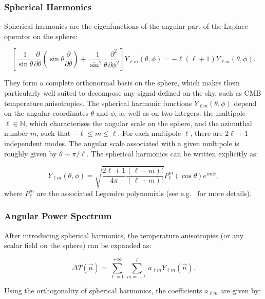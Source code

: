\documentclass[../../thesis.tex]{subfiles}
\begin{document}
\subsubsection{Spherical Harmonics}

Spherical harmonics are the eigenfunctions of the angular part of the Laplace operator on the sphere:

\begin{equation} \label{eq:laplace}
    [\frac{1}{\sin\theta}\frac{\partial}{\partial\theta}(\sin\theta\frac{\partial}{\partial\theta}) + \frac{1}{\sin^2\theta}\frac{\partial^2}{\partial\phi^2}] Y_{\ell m}(\theta,\phi) = -\ell(\ell + 1) Y_{\ell m}(\theta,\phi).
\end{equation}

They form a complete orthonormal basis on the sphere, which makes them particularly well suited to decompose any signal defined on the sky, such as CMB temperature anisotropies.
The spherical harmonic functions $Y_{\ell m}(\theta,\phi)$ depend on the angular coordinates $\theta$ and $\phi$, as well as on two integers: the multipole $\ell \in \mathbb{N}$, which characterises the angular scale on the sphere, and the azimuthal number $m$, such that $-\ell \leq m \leq \ell$. For each multipole $\ell$, there are $2\ell + 1$ independent modes. The angular scale associated with a given multipole is roughly given by $\theta \sim \pi / \ell$.
The spherical harmonics can be written explicitly as:

\begin{equation}
    Y_{\ell m}(\theta,\phi) = \sqrt{\frac{2\ell+1}{4\pi}\frac{(\ell-m)!}{(\ell+m)!}} P^m_{\ell}(\cos\theta)e^{i m \phi},
\end{equation}
where $P^m_{\ell}$ are the associated Legendre polynomials (see e.g.~\cite{maths_handbook} for more details).

\subsubsection{Angular Power Spectrum} 

After introducing spherical harmonics, the temperature anisotropies (or any scalar field on the sphere) can be expanded as:

\begin{equation}
    \Delta T(\vec{n}) = \sum_{\ell=0}^{+\infty}\sum_{m=-\ell}^{\ell}a_{\ell m}Y_{\ell m}(\vec{n}).
\end{equation}

Using the orthogonality of spherical harmonics, the coefficients $a_{\ell m}$ are given by:
\end{document}
